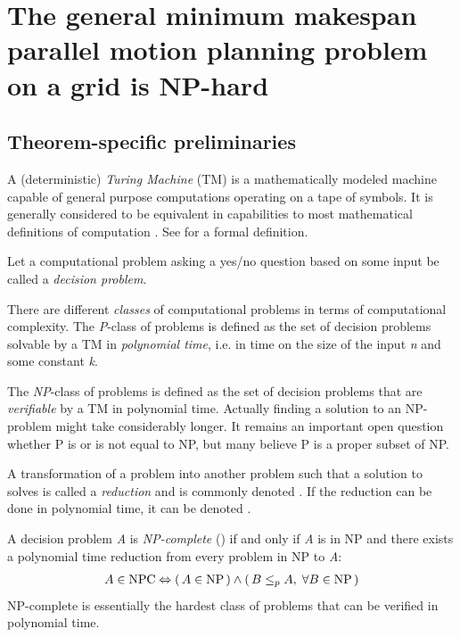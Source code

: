 \section{The general minimum makespan parallel motion planning problem on a grid is NP-hard}

\cite{siamcomp/DemaineFKMS19} \cite{corr/YuL15c}

\subsection{Theorem-specific preliminaries}

A (deterministic) \emph{Turing Machine} (TM) is a mathematically modeled machine capable of general purpose computations operating on a tape of symbols. It is generally considered to be equivalent in capabilities to most mathematical definitions of computation \cite{aw/HopcroftU79}. See \cite{aw/HopcroftU79} for a formal definition.

Let a computational problem asking a yes/no question based on some input be called a \emph{decision problem}.

There are different \emph{classes} of computational problems in terms of computational complexity. The \emph{P}-class of problems is defined as the set of decision problems solvable by a TM in \emph{polynomial time}, i.e. in  time on the size of the input \emph{n} and some constant \emph{k}.

The \emph{NP}-class of problems is defined as the set of decision problems that are \emph{verifiable} by a TM in polynomial time. Actually finding a solution to an NP-problem might take considerably longer. It remains an important open question whether P is or is not equal to NP, but many believe P is a proper subset of NP.

A transformation of a problem  into another problem  such that a solution to  solves  is called a \emph{reduction} and is commonly denoted . If the reduction can be done in polynomial time, it can be denoted .

\begin{definition}\label{def:np_complete}
	A decision problem \emph{A} is \emph{NP-complete} () if and only if \emph{A} is in NP and there exists a polynomial time reduction from every problem in NP to \emph{A}:
	\begin{align*}
		A \in \text{NPC} \Leftrightarrow (\, A \in \text{NP} \,) \land (\, B \leq_p A, \; \forall B \in \text{NP} \,)
	\end{align*}
	NP-complete is essentially the hardest class of problems that can be verified in polynomial time. 
\end{definition}

